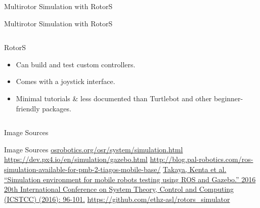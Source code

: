 \documentclass[9pt]{beamer}
\begin{document}
\begin{section}{Multirotor Simulation with RotorS}
\begin{frame}{Multirotor Simulation with RotorS}
\begin{columns}
\begin{column}{0.5\textwidth}
\begin{block}{RotorS}
\begin{itemize}
                    \item Can build and test custom controllers. 
                    \item Comes with a joystick interface. 
                    \item Minimal tutorials \& less documented than Turtlebot and other beginner-friendly packages. 
                \end{itemize}
            \end{block}
        \end{column}            
    \end{columns}
    \end{frame}
\end{section}

\begin{section}{Image Sources}
\begin{frame}{Image Sources}
\url{osrobotics.org/osr/system/simulation.html}
\url{https://dev.px4.io/en/simulation/gazebo.html}
\url{http://blog.pal-robotics.com/ros-simulation-available-for-pmb-2-tiagos-mobile-base/}
\url{Takaya, Kenta et al. “Simulation environment for mobile robots testing using ROS and Gazebo.” 2016 20th International Conference on System Theory, Control and Computing (ICSTCC) (2016): 96-101.}
\url{https://github.com/ethz-asl/rotors_simulator}
\end{frame}
\end{section}
\end{document}
